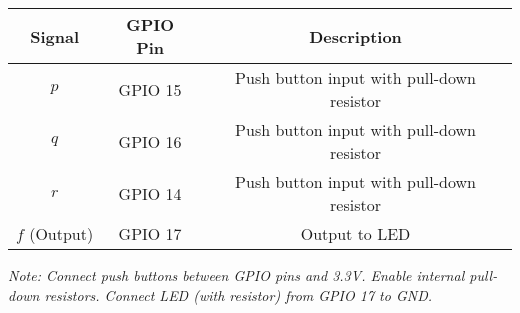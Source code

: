 \documentclass{article}
\begin{document}
\begin{tabular}{|c|c|c|}
\hline
\textbf{Signal} & \textbf{GPIO Pin} & \textbf{Description} \\
\hline
\(p\) & GPIO 15 & Push button input with pull-down resistor \\
\(q\) & GPIO 16 & Push button input with pull-down resistor \\
\(r\) & GPIO 14 & Push button input with pull-down resistor \\
\(f\) (Output) & GPIO 17 & Output to LED \\
\hline
\end{tabular}

\bigskip
\textit{Note: Connect push buttons between GPIO pins and 3.3V. Enable internal pull-down resistors. Connect LED (with resistor) from GPIO 17 to GND.}
\end{document}
